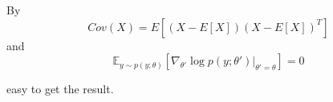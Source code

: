 \begin{answer}
By
    $$
    Cov(X) = E[(X - E[X])(X - E[X])^T]
    $$
and
$$\mathbb{E}_{y\sim p(y;\theta)}[\nabla_{\theta'} \log p(y;\theta')|_{\theta'=\theta}]=0$$

easy to get the result.

\end{answer}
